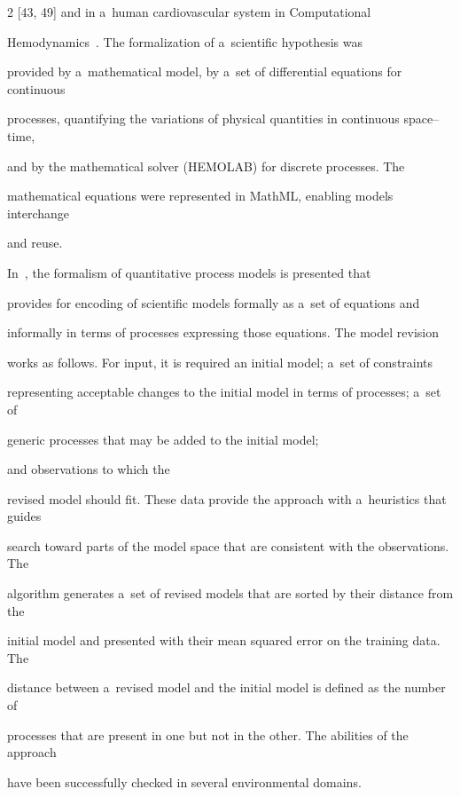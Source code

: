 \begin{multicols}{2}
[43, 49] and in a~human cardiovascular system in Computational


Hemodynamics~\cite{11-kl, 50-kl}. The formalization of a~scientific hypothesis was


provided by a~mathematical model, by a~set of differential equations for continuous


processes, quantifying the variations of physical quantities in continuous space--time,


and by the mathematical solver (HEMOLAB) for discrete processes. The


mathematical equations were represented in MathML, enabling models interchange


and reuse.





  In~\cite{51-kl}, the formalism of quantitative process models is presented that


provides for encoding of scientific models formally as a~set of equations and


informally in terms of processes expressing those equations. The model revision


works as follows. For input, it is required an initial model; a~set of constraints


representing acceptable changes to the initial model in terms of processes; a~set of


generic processes that may be added to the initial model;


and observations to which the


revised model should fit. These data provide the approach with a~heuristics that guides


search toward parts of the model space that are consistent with the observations. The


algorithm generates a~set of revised models that are sorted by their distance from the


initial model and presented with their mean squared error on the training data. The


distance between a~revised model and the initial model is defined as the number of


processes that are present in one but not in the other. The abilities of the approach


have been successfully checked in several environmental domains.






\end{multicols}
